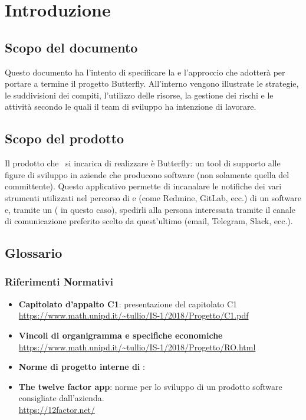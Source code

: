 \newpage
\section{Introduzione} \label{Introduzione}
	
	\subsection{Scopo del documento}
	Questo documento ha l'intento di specificare la  e l'approccio che \gruppo adotterà per portare a termine il progetto Butterfly.
	All'interno vengono illustrate le strategie, le suddivisioni dei compiti, l'utilizzo delle risorse, la gestione dei rischi e le attività secondo le quali il team di sviluppo ha intenzione di lavorare.
	
	\subsection{Scopo del prodotto}	
	Il prodotto che \gruppo\ si incarica di realizzare è Butterfly: un tool di supporto alle figure di sviluppo in aziende che producono software (non solamente quella del committente).
	Questo applicativo permette di incanalare le notifiche dei vari strumenti utilizzati nel percorso di  e  (come Redmine, GitLab, ecc.) di un software e, tramite un  ( in questo caso), spedirli alla persona interessata tramite il canale di comunicazione
	preferito scelto da quest'ultimo (email, Telegram, Slack, ecc.).
	
	\subsection{Glossario}
		\subsubsection{Riferimenti Normativi}
			\begin{itemize}
				\item \textbf{Capitolato d'appalto C1}: presentazione del capitolato C1\\
				\url{https://www.math.unipd.it/~tullio/IS-1/2018/Progetto/C1.pdf}
				\item \textbf{Vincoli di organigramma e specifiche economiche}\\
				\url{https://www.math.unipd.it/~tullio/IS-1/2018/Progetto/RO.html}
				\item \textbf{Norme di progetto interne di \gruppo}: \NdPv
				\item \textbf{The twelve factor app}: norme per lo sviluppo di un prodotto software consigliate dall'azienda.\\
				\url{https://12factor.net/}
			\end{itemize}
		
